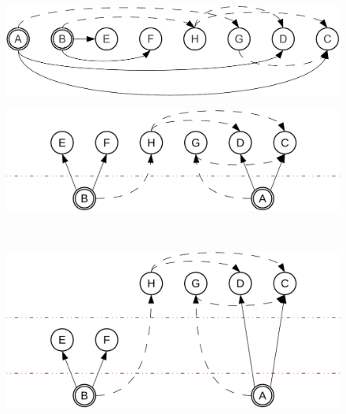 
\begin{figure}[tp]
  \vspace{-5mm}
  \begin{minipage}[b]{0.5\linewidth}
    \centering
    \includegraphics[scale=0.4]{figures/complementation/steps-0.pdf}
    \label{hiercomp/fig:multiple:steps:0}
  \end{minipage}
  \begin{minipage}[b]{0.5\linewidth}
    \centering
    \includegraphics[scale=0.4]{figures/complementation/steps-1.pdf}
    \label{hiercomp/fig:multiple:steps:1}
  \end{minipage}
  \vspace{0mm}                  %
  \\
  \begin{minipage}[b]{0.5\linewidth}
    \centering
    \includegraphics[scale=0.4]{figures/complementation/steps-2.pdf}
    \label{hiercomp/fig:multiple:steps:2}
  \end{minipage}
  \begin{minipage}[b]{0.5\linewidth}

\end{minipage}
\end{figure}
